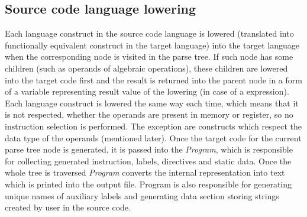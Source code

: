 \subsection{Source code language lowering}
Each language construct in the source code language is lowered (translated into functionally equivalent construct in the target language) into the target language when the corresponding node is visited in the parse tree. If such node has some children (such as operands of algebraic operations), these children are lowered into the target code first and the result is returned into the parent node in a form of a variable representing result value of the lowering (in case of a expression). Each language construct is lowered the same way each time, which means that it is not respected, whether the operands are present in memory or register, so no instruction selection is performed. The exception are constructs which respect the data type of the operands (mentioned later). Once the target code for the current parse tree node is generated, it is passed into the \textit{Program}, which is responsible for collecting generated instruction, labels, directives and static data. Once the whole tree is traversed \textit{Program} converts the internal representation into text which is printed into the output file. Program is also responsible for generating unique names of auxiliary labels and generating data section storing strings created by user in the source code.

